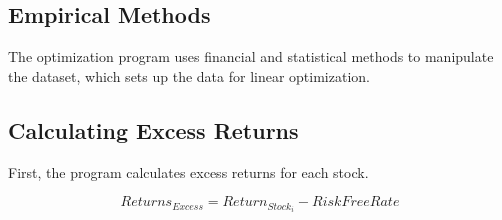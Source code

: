 \documentclass[12pt,english]{article}
\begin{document}
\begin{doublespace}
    \section{Empirical Methods}\label{sec:methods}\indent{}\indent{} %
    
        The optimization program uses financial and statistical methods to manipulate the dataset, which sets up the data for linear optimization. 
        
        \subsection{Calculating Excess Returns}
        
    	    First, the program calculates excess returns for each stock.
    	    
                \end{doublespace}
                    \begin{singlespace}
                        \begin{center}
                            \begin{equation} \label{Excess Returns}
                                Returns_{Excess} = Return_{Stock_{i}} - RiskFreeRate
                            \end{equation}
                        \end{center}
                    \end{singlespace}
\end{document}

